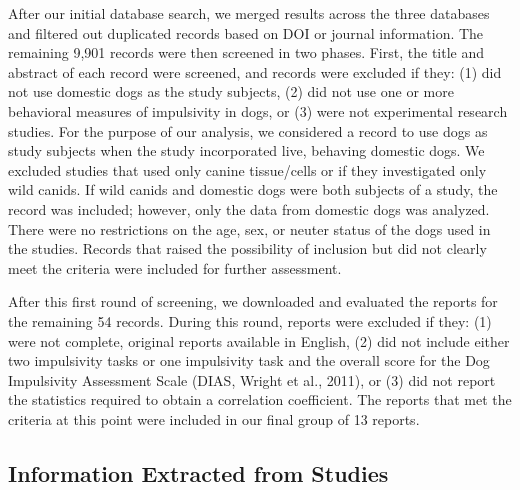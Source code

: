 \documentclass[
  ,pub,floatsintext]{apa6}
\begin{document}
After our initial database search, we merged results across the three databases and filtered out duplicated records based on DOI or journal information. The remaining 9,901 records were then screened in two phases. First, the title and abstract of each record were screened, and records were excluded if they: (1) did not use domestic dogs as the study subjects, (2) did not use one or more behavioral measures of impulsivity in dogs, or (3) were not experimental research studies. For the purpose of our analysis, we considered a record to use dogs as study subjects when the study incorporated live, behaving domestic dogs. We excluded studies that used only canine tissue/cells or if they investigated only wild canids. If wild canids and domestic dogs were both subjects of a study, the record was included; however, only the data from domestic dogs was analyzed. There were no restrictions on the age, sex, or neuter status of the dogs used in the studies. Records that raised the possibility of inclusion but did not clearly meet the criteria were included for further assessment.

After this first round of screening, we downloaded and evaluated the reports for the remaining 54 records. During this round, reports were excluded if they: (1) were not complete, original reports available in English, (2) did not include either two impulsivity tasks or one impulsivity task and the overall score for the Dog Impulsivity Assessment Scale (DIAS, Wright et al., 2011), or (3) did not report the statistics required to obtain a correlation coefficient. The reports that met the criteria at this point were included in our final group of 13 reports.

\hypertarget{information-extracted-from-studies}{%
\subsection{Information Extracted from Studies}\label{information-extracted-from-studies}}
\end{document}
